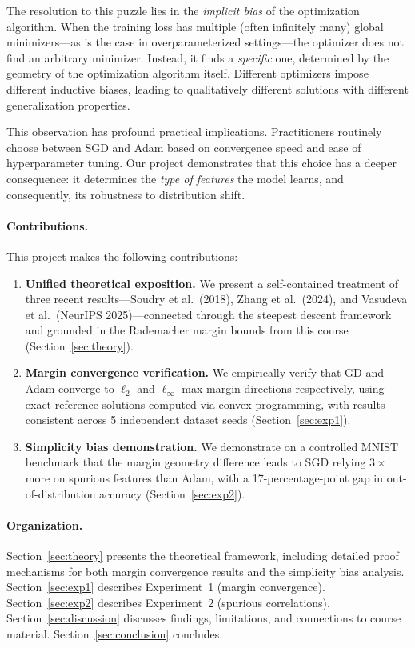\documentclass{article}
\begin{document}
The resolution to this puzzle lies in the \emph{implicit bias} of the optimization algorithm. When the training loss has multiple (often infinitely many) global minimizers---as is the case in overparameterized settings---the optimizer does not find an arbitrary minimizer. Instead, it finds a \emph{specific} one, determined by the geometry of the optimization algorithm itself. Different optimizers impose different inductive biases, leading to qualitatively different solutions with different generalization properties.

This observation has profound practical implications. Practitioners routinely choose between SGD and Adam based on convergence speed and ease of hyperparameter tuning. Our project demonstrates that this choice has a deeper consequence: it determines the \emph{type of features} the model learns, and consequently, its robustness to distribution shift.

\paragraph{Contributions.} This project makes the following contributions:

\begin{enumerate}[leftmargin=*]
    \item \textbf{Unified theoretical exposition.} We present a self-contained treatment of three recent results---Soudry et al.\ (2018), Zhang et al.\ (2024), and Vasudeva et al.\ (NeurIPS 2025)---connected through the steepest descent framework and grounded in the Rademacher margin bounds from this course (Section~\ref{sec:theory}).
    
    \item \textbf{Margin convergence verification.} We empirically verify that GD and Adam converge to $\ell_2$ and $\ell_\infty$ max-margin directions respectively, using exact reference solutions computed via convex programming, with results consistent across 5 independent dataset seeds (Section~\ref{sec:exp1}).
    
    \item \textbf{Simplicity bias demonstration.} We demonstrate on a controlled MNIST benchmark that the margin geometry difference leads to SGD relying $3\times$ more on spurious features than Adam, with a 17-percentage-point gap in out-of-distribution accuracy (Section~\ref{sec:exp2}).
\end{enumerate}

\paragraph{Organization.} Section~\ref{sec:theory} presents the theoretical framework, including detailed proof mechanisms for both margin convergence results and the simplicity bias analysis. Section~\ref{sec:exp1} describes Experiment~1 (margin convergence). Section~\ref{sec:exp2} describes Experiment~2 (spurious correlations). Section~\ref{sec:discussion} discusses findings, limitations, and connections to course material. Section~\ref{sec:conclusion} concludes.
\end{document}
